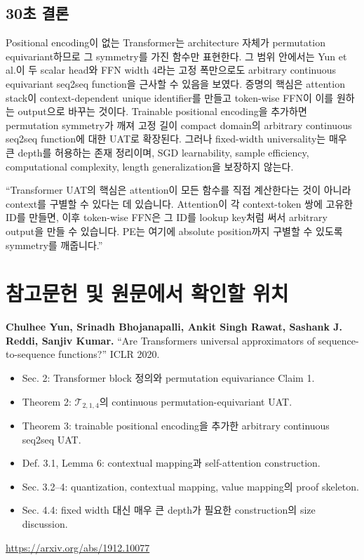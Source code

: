 \documentclass[11pt,a4paper,oneside,openany]{memoir}
\theoremstyle{definition}
\begin{document}
\section{30초 결론}

Positional encoding이 없는 Transformer는 architecture 자체가 permutation equivariant하므로 그 symmetry를 가진 함수만 표현한다.
그 범위 안에서는 Yun et al.이 두 scalar head와 FFN width 4라는 고정 폭만으로도 arbitrary continuous equivariant seq2seq function을 근사할 수 있음을 보였다.
증명의 핵심은 attention stack이 context-dependent unique identifier를 만들고 token-wise FFN이 이를 원하는 output으로 바꾸는 것이다.
Trainable positional encoding을 추가하면 permutation symmetry가 깨져 고정 길이 compact domain의 arbitrary continuous seq2seq function에 대한 UAT로 확장된다.
그러나 fixed-width universality는 매우 큰 depth를 허용하는 존재 정리이며, SGD learnability, sample efficiency, computational complexity, length generalization을 보장하지 않는다.

\begin{presentbox}
``Transformer UAT의 핵심은 attention이 모든 함수를 직접 계산한다는 것이 아니라 context를 구별할 수 있다는 데 있습니다. Attention이 각 context-token 쌍에 고유한 ID를 만들면, 이후 token-wise FFN은 그 ID를 lookup key처럼 써서 arbitrary output을 만들 수 있습니다. PE는 여기에 absolute position까지 구별할 수 있도록 symmetry를 깨줍니다.''
\end{presentbox}

\chapter*{참고문헌 및 원문에서 확인할 위치}

\textbf{Chulhee Yun, Srinadh Bhojanapalli, Ankit Singh Rawat, Sashank J. Reddi, Sanjiv Kumar.}
``Are Transformers universal approximators of sequence-to-sequence functions?'' ICLR 2020.

\begin{itemize}
  \item Sec. 2: Transformer block 정의와 permutation equivariance Claim 1.
  \item Theorem 2: $\mathcal T_{2,1,4}$의 continuous permutation-equivariant UAT.
  \item Theorem 3: trainable positional encoding을 추가한 arbitrary continuous seq2seq UAT.
  \item Def. 3.1, Lemma 6: contextual mapping과 self-attention construction.
  \item Sec. 3.2--4: quantization, contextual mapping, value mapping의 proof skeleton.
  \item Sec. 4.4: fixed width 대신 매우 큰 depth가 필요한 construction의 size discussion.
\end{itemize}
\url{https://arxiv.org/abs/1912.10077}
\end{document}
